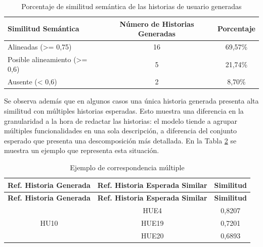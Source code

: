 \begin{table}[htb]
\centering
\begin{tabular}{|l|c|c|}
\hline
\textbf{Similitud Semántica} & \textbf{Número de Historias Generadas} & \textbf{Porcentaje} \\
\hline
Alineadas (>= 0,75)   & 16  & 69,57\%  \\
Posible alineamiento (>= 0,6) & 5 & 21,74\% \\
Ausente (< 0,6) & 2 & 8,70\% \\
\hline
\end{tabular}
\caption{Porcentaje de similitud semántica de las historias de usuario generadas}
\label{tab:hu_estados}
\end{table}

Se observa además que en algunos casos una única historia generada presenta alta similitud con múltiples historias esperadas. Esto muestra una diferencia en la granularidad a la hora de redactar las historias: el modelo tiende a agrupar múltiples funcionalidades en una sola descripción, a diferencia del conjunto esperado que presenta una descomposición más detallada. En la Tabla \ref{tab:granularity_example} se muestra un ejemplo que representa esta situación.

\begin{longtable}{|c|c|c|}
\caption{Ejemplo de correspondencia múltiple}
\label{tab:granularity_example} \\
\hline
\textbf{Ref. Historia Generada} & \textbf{Ref. Historia Esperada Similar} & \textbf{Similitud} \\
\hline
\endfirsthead

\hline
\textbf{Ref. Historia Generada} & \textbf{Ref. Historia Esperada Similar} & \textbf{Similitud} \\
\hline
\endhead

\multirow{3}{*}{HU10} & HUE4 & 0,8207 \\
\cline{2-3}
     & HUE19 & 0,7201 \\
\cline{2-3}
     & HUE20 & 0,6893 \\
\hline

\end{longtable}


